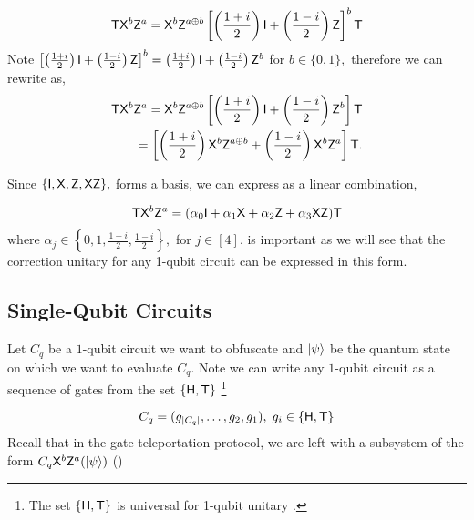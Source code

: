 \begin{equation}
\label{eq:pgate1}
{\sf T} {\sf X}^b {\sf Z}^a={\sf X}^b {\sf Z}^{a\oplus b}\left[\left(\frac{1+i}{2}\right) {\sf I} + \left(\frac{1-i}{2}\right){\sf Z}\right]^b {\sf T}
\end{equation}
Note  $\left[\left(\frac{1+i}{2}\right) {\sf I} + \left(\frac{1-i}{2}\right){\sf Z}\right]^b=\left(\frac{1+i}{2}\right) {\sf I} + \left(\frac{1-i}{2}\right){\sf Z}^b$ for $b \in \{0,1\},$ therefore we can rewrite   as,
\begin{equation}
\label{eq:pgate2}
\begin{aligned}
{\sf T} {\sf X}^b {\sf Z}^a={\sf X}^b {\sf Z}^{a\oplus b}\left[\left(\frac{1+i}{2}\right) {\sf I} + \left(\frac{1-i}{2}\right){\sf Z}^b\right] {\sf T} \\
=\left[\left(\frac{1+i}{2}\right) {\sf X}^b {\sf Z}^{a\oplus b} + \left(\frac{1-i}{2}\right){\sf X}^b {\sf Z}^a\right] {\sf T}. \\
\end{aligned}
\end{equation}

Since $\{{\sf I}, {\sf X}, {\sf Z}, {\sf X} {\sf Z}\},$ forms a basis, we can  express  as a linear combination,

\begin{equation}
\label{eq:pgate3}
\begin{aligned}
{\sf T} {\sf X}^b {\sf Z}^a= (\alpha_0 {\sf I} +  \alpha_1 {\sf X} + \alpha_2 {\sf Z} + \alpha_3 {\sf X}{\sf Z}){\sf T} \\
\end{aligned}
\end{equation}
where $\alpha_j \in\left\{0,1, \frac{1+i}{2}, \frac{1-i}{2}\right\},$ for  $j\in[4]$.  is important as we will see that the correction unitary for any 1-qubit circuit can be expressed in this form.

\subsection{Single-Qubit Circuits}
\label{sec:1-qubit}

Let $C_q$ be a $1$-qubit circuit we want to obfuscate and ${\lvert}\psi\rangle$ be the quantum state on which we want to evaluate $C_q.$ Note we can write any $1$-qubit circuit as a sequence of gates from the set $\{{\sf H}, {\sf T}\}$ \footnote{The set $\{{\sf H},  {\sf T}\}$ is universal for 1-qubit unitary \cite{KLM07}.}

$$C_q=(g_{|C_q|},\ldots,g_2,g_1 ),\; g_i\in\{{\sf H}, {\sf T}\}$$
Recall that in the gate-teleportation protocol, we are left with a subsystem of the form $C_q {\sf X}^b{\sf Z}^a ({\lvert}\psi\rangle)$ ()

